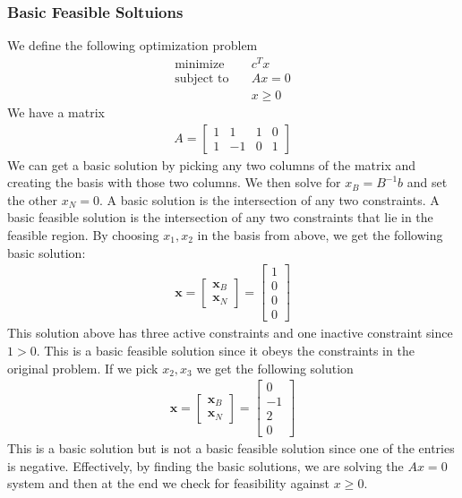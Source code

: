 \subsubsection{Basic Feasible Soltuions}
We define the following optimization problem
\begin{align}
  \text{minimize} & \quad c^T x \\
  \text{subject to} & \quad Ax = 0 \\
  & \quad x \geq 0
\end{align}
We have a matrix 
\begin{align}
  A =
  \begin{bmatrix}
     1 & 1 & 1 & 0 \\
     1 & -1 & 0 & 1 
  \end{bmatrix}
\end{align}
We can get a basic solution by picking any two columns of the matrix and creating the basis with those two columns.
We then solve for $x_B = B^{-1} b$ and set the other $x_N = 0$.
A basic solution is the intersection of any two constraints.
A basic feasible solution is the intersection of any two constraints that lie in the feasible region.
By choosing $x_1, x_2$ in the basis from above, we get the following basic solution:
\begin{align}
  \textbf{x} = 
  \begin{bmatrix}
     \textbf{x}_B \\
     \textbf{x}_N
  \end{bmatrix}
  =
  \begin{bmatrix}
    1 \\
    0 \\
    0 \\
    0
  \end{bmatrix}
\end{align}
This solution above has three active constraints and one inactive constraint since $1 > 0$.
This is a basic feasible solution since it obeys the constraints in the original problem.
If we pick $x_2, x_3$ we get the following solution
\begin{align}
  \textbf{x} = 
  \begin{bmatrix}
     \textbf{x}_B \\
     \textbf{x}_N
  \end{bmatrix}
  =
  \begin{bmatrix}
    0 \\
    -1 \\
    2 \\
    0
  \end{bmatrix}
\end{align}
This is a basic solution but is not a basic feasible solution since one of the entries is negative.
Effectively, by finding the basic solutions, we are solving the $Ax = 0$ system and then at the end we check for feasibility against $x \geq 0$.

